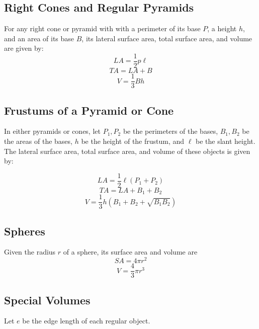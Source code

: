 \documentclass[final, letterpaper, 12pt]{article}
\begin{document}
	\subsection{Right Cones and Regular Pyramids}\label{sec: looking at the aspects of the pyramids/cones}
	For any right cone or pyramid with with a perimeter of its base $P$, a height $h$, and an area of its base $B$, its lateral surface area, total surface area, and volume are given by:
		\begin{equation}
			LA = \frac{1}{2}p\ell
		\end{equation}
		\begin{equation}
			TA = LA+B
		\end{equation}
		\begin{equation}
			V = \frac{1}{3}Bh
		\end{equation}
	\subsection{Frustums of a Pyramid or Cone}\label{sec: the special formulae relating to frustums}
		In either pyramids or cones, let $P_1, P_2$ be the perimeters of the bases, $B_1, B_2$ be the areas of the bases, $h$ be the height of the frustum, and $\ell$ be the slant height. The lateral surface area, total surface area, and volume of these objects is given by:
		
		\begin{equation}
			LA = \frac{1}{2}{\ell}(P_1 + P_2)
		\end{equation}
		\begin{equation}
			TA = LA + B_1 + B_2
		\end{equation}
		\begin{equation}
			V = \frac{1}{3}h\left(B_1 + B_2 + \sqrt{B_1 B_2}\right)
		\end{equation}
	\subsection{Spheres}\label{sec: properties of a sphere}
	Given the radius $r$ of a sphere, its surface area and volume are
		\begin{equation}
			SA = 4\pi r^2
		\end{equation}
		\begin{equation}
			V = \frac{4}{3}\pi r^3
		\end{equation}
	\subsection{Special Volumes}\label{sec: volumes of regular square pyramid, regular octahedron, regular tetrahedron}
		Let $e$ be the edge length of each regular object.
		
\end{document}
